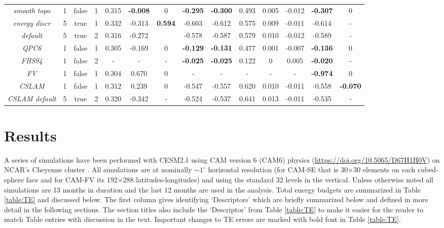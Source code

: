 \documentclass[draft,linenumbers]{agujournal}
\begin{document}
\begin{table}
\begin{tabular}{c|ccc|ccc|cccccc|c}
%
%
%
%
{\em{smooth topo}} & 1 & false & 1  &  0.315& {\bf{-0.008}}& 0  & {\bf{-0.295}}& {\bf{-0.300}}  &  0.493& 0.005          & -0.012& {\bf{-0.307}} & 0\\
{\em{energy discr}} & 5 & true  & 1 &  0.332& -0.313& {\bf{0.594}}& -0.603& -0.612&  0.575& 0.009          & -0.011& -0.614 & -\\
{\em{default}}      & 5 & true  & 2 &  0.316& -0.272&             & -0.578& -0.587&  0.579& 0.010          & -0.012& -0.589 & -\\ %
\hline
{\em{QPC6}}         & 1 & false & 1 &  0.305& -0.169& 0    &{\bf{-0.129}}& {\bf{-0.131}}&  0.477& 0.001 & -0.007& {\bf{-0.136}} & 0\\
{\em{FHS94}}        & 1 & false & 2 &  -    &   -   &  -   & {\bf{-0.025}}&{\bf{-0.025}} &  0.122& 0 &  0.005 & {\bf{-0.020}} & -\\
{\em{FV}}       & 1 & false & 1 &  0.304&  0.670& 0    & - & - & - & - & - & {\bf{-0.974}} & 0 \\
{\em{CSLAM}} & 1 & false & 1 &  0.312& 0.239& 0 & -0.547& -0.557&   0.620&   0.010& -0.011& -0.558& {\bf{-0.070}}\\
{\em{CSLAM default}} & 5 & true   & 2   &   0.320& -0.342&  - & -0.524& -0.537&  0.641& 0.013& -0.011& -0.535& - 
  \end{tabular}
  \end{table}

\section{Results}
\label{sec:results}
A series of simulations have been performed with CESM2.1 using CAM version 6 (CAM6) physics (\url{https://doi.org/10.5065/D67H1H0V}) on NCAR's Cheyenne cluster \citep{cheyenne}. All simulations are at nominally $\sim1^{\circ}$ horizontal resolution (for CAM-SE that is 30$\times$30 elements on each cubed-sphere face and for CAM-FV its 192$\times$288 latitudes-longitudes) and using the standard 32 levels in the vertical. Unless otherwise noted all simulations are 13 months in duration and the last 12 months are used in the analysis. Total energy budgets are summarized in Table \ref{table:TE} and discussed below. The first column gives identifying `Descriptors' which are briefly summarized below and defined in more detail in the following sections. The section titles also include the `Descriptor' from Table \ref{table:TE} to make it easier for the reader to match Table entries with discussion in the text. Important changes to TE errors are marked with bold font in Table \ref{table:TE}.
\end{document}
